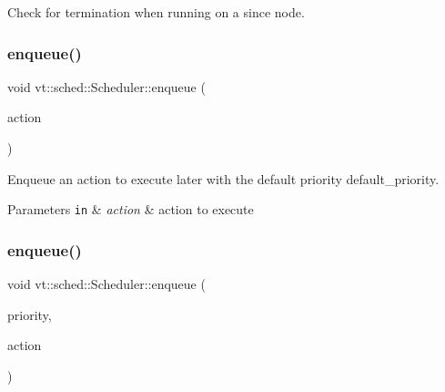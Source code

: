 Check for termination when running on a since node. 

\mbox{\label{structvt_1_1sched_1_1_scheduler_a82a78f782999127d461208bc948268a4}} 
\subsubsection{\texorpdfstring{enqueue()}{enqueue()}\hspace{0.1cm}{\footnotesize\ttfamily [1/4]}}
{\footnotesize\ttfamily void vt\+::sched\+::\+Scheduler\+::enqueue (\begin{DoxyParamCaption}\item[{\hyperlink{namespacevt_ae0a5a7b18cc99d7b732cb4d44f46b0f3}{Action\+Type}}]{action }\end{DoxyParamCaption})}



Enqueue an action to execute later with the default priority {\ttfamily default\+\_\+priority}. 


\begin{DoxyParams}[1]{Parameters}
\mbox{\tt in}  & {\em action} & action to execute \\
\hline
\end{DoxyParams}
\mbox{\label{structvt_1_1sched_1_1_scheduler_afb1616da4dfb63b8a83e15af720d9f3f}} 
\subsubsection{\texorpdfstring{enqueue()}{enqueue()}\hspace{0.1cm}{\footnotesize\ttfamily [2/4]}}
{\footnotesize\ttfamily void vt\+::sched\+::\+Scheduler\+::enqueue (\begin{DoxyParamCaption}\item[{\hyperlink{namespacevt_a86bff9f556eb761b27fc8600d006ac04}{Priority\+Type}}]{priority,  }\item[{\hyperlink{namespacevt_ae0a5a7b18cc99d7b732cb4d44f46b0f3}{Action\+Type}}]{action }\end{DoxyParamCaption})}



